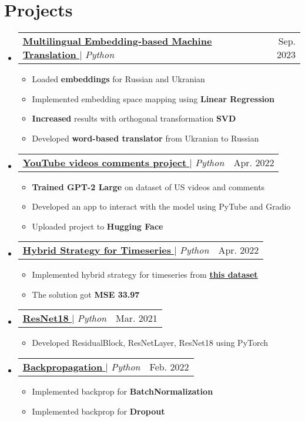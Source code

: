 \documentclass[english,russian,letterpaper,11pt]{article}
\makeatletter
\newcommand{\resumeItem}[1]{
  \item\small{
    {#1 \vspace{-2pt}}
  }
}
\newcommand{\resumeProjectHeading}[2]{
    \item
    \begin{tabular*}{0.97\textwidth}{l@{\extracolsep{\fill}}r}
      \small#1 & #2 \\
    \end{tabular*}\vspace{-7pt}
}
\newcommand{\resumeSubHeadingListStart}{\begin{itemize}[leftmargin=0.15in, label={}]}
\newcommand{\resumeSubHeadingListEnd}{\end{itemize}}
\newcommand{\resumeItemListStart}{\begin{itemize}}
\newcommand{\resumeItemListEnd}{\end{itemize}\vspace{-5pt}}
\makeatother
\begin{document}
\section{Projects}
\resumeSubHeadingListStart
    \resumeProjectHeading
      {\href{https://github.com/alexbuyan/nlp_course/blob/2023/week01_embeddings/homework.ipynb}{\underline{\textbf{Multilingual Embedding-based Machine Translation}} \faGithub} $|$ \emph{Python}}{Sep. 2023}
      \resumeItemListStart
        \resumeItem{Loaded \textbf{embeddings} for Russian and Ukranian}
        \resumeItem{Implemented embedding space mapping using \textbf{Linear Regression}}
        \resumeItem{\textbf{Increased} results with orthogonal transformation \textbf{SVD}}
        \resumeItem{Developed \textbf{word-based translator} from Ukranian to Russian}
      \resumeItemListEnd
    \resumeProjectHeading
        {\href{https://huggingface.co/spaces/alexbuyan/yt_videos_comments_devops_projects}{\underline{\textbf{YouTube videos comments project}} \faGithub} $|$ \emph{Python}}{Apr. 2022}
        \resumeItemListStart
          \resumeItem{\textbf{Trained GPT-2 Large} on dataset of US videos and comments}
          \resumeItem{Developed an app to interact with the model using PyTube and Gradio}
          \resumeItem{Uploaded project to \textbf{Hugging Face}}
        \resumeItemListEnd
    \resumeProjectHeading
        {\href{https://github.com/alexbuyan/ml_projects/tree/main/hybrid_strategy}{\underline{\textbf{Hybrid Strategy for Timeseries}} \faGithub} $|$ \emph{Python}}{Apr. 2022}
        \resumeItemListStart
          \resumeItem{Implemented hybrid strategy for timeseries from \href{https://www.kaggle.com/c/demand-forecasting-kernels-only}{\underline{\textbf{this dataset}}}}
          \resumeItem{The solution got \textbf{MSE 33.97}}
        \resumeItemListEnd
    \resumeProjectHeading
        {\href{https://github.com/alexbuyan/ml_projects/tree/main/resnet18}{\underline{\textbf{ResNet18}} \faGithub} $|$ \emph{Python}}{Mar. 2021}
        \resumeItemListStart
          \resumeItem{Developed ResidualBlock, ResNetLayer, ResNet18 using PyTorch}
        \resumeItemListEnd
    \resumeProjectHeading
        {\href{https://github.com/alexbuyan/ml_projects/tree/main/backprop}{\underline{\textbf{Backpropagation}} \faGithub} $|$ \emph{Python}}{Feb. 2022}
        \resumeItemListStart
          \resumeItem{Implemented backprop for \textbf{BatchNormalization}}
          \resumeItem{Implemented backprop for \textbf{Dropout}}
        \resumeItemListEnd
\resumeSubHeadingListEnd
\end{document}
